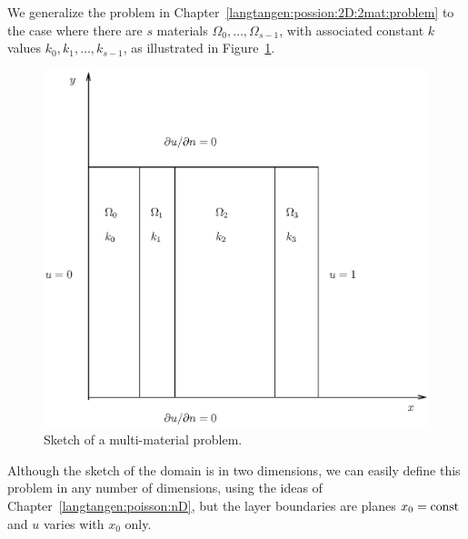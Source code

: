 We generalize the problem in Chapter~\ref{langtangen:possion:2D:2mat:problem}
to the case where there are $s$ materials $\Omega_0,\ldots,\Omega_{s-1}$,
with associated constant $k$ values $k_0,k_1,\ldots,k_{s-1}$,
as illustrated in Figure~\ref{langtangen:possion:nD:nmat:fig1}.
\begin{figure}
\centerline{
\includegraphics[width=0.7\linewidth]{chapters/langtangen/eps/layers.eps}
  }
  \caption{\label{langtangen:possion:nD:nmat:fig1}
  Sketch of a multi-material problem.
  }
\end{figure}
Although the sketch of the domain is in two dimensions, we can easily
define this problem in any number of dimensions, using
the ideas of Chapter~\ref{langtangen:poisson:nD}, but the layer
boundaries are planes $x_0=\hbox{const}$ and $u$ varies with
$x_0$ only.

